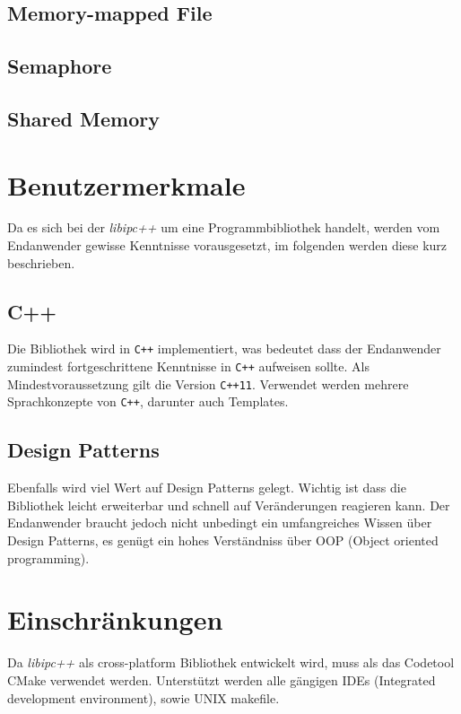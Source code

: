 \documentclass[a4paper]{book}
\begin{document}
\subsection{Memory-mapped File}
\blindtext

\subsection{Semaphore}
\blindtext

\subsection{Shared Memory}
\blindtext

\section{Benutzermerkmale}
Da es sich bei der \textit{libipc++} um eine Programmbibliothek handelt, werden vom Endanwender gewisse Kenntnisse vorausgesetzt, im folgenden werden diese kurz beschrieben.

\subsection{C++}
Die Bibliothek wird in \texttt{C++} implementiert, was bedeutet dass der Endanwender zumindest fortgeschrittene Kenntnisse in \texttt{C++} aufweisen sollte. Als Mindestvoraussetzung gilt die Version \texttt{C++11}. Verwendet werden mehrere Sprachkonzepte von \texttt{C++}, darunter auch Templates.

\subsection{Design Patterns}
Ebenfalls wird viel Wert auf Design Patterns gelegt. Wichtig ist dass die Bibliothek leicht erweiterbar und schnell auf Veränderungen reagieren kann. Der Endanwender braucht jedoch nicht unbedingt ein umfangreiches Wissen über Design Patterns, es genügt ein hohes Verständniss über OOP (Object oriented programming).

\section{Einschränkungen}
Da \textit{libipc++} als cross-platform Bibliothek entwickelt wird, muss als das Codetool CMake verwendet werden. Unterstützt werden alle gängigen IDEs (Integrated development environment), sowie UNIX makefile.
\end{document}
